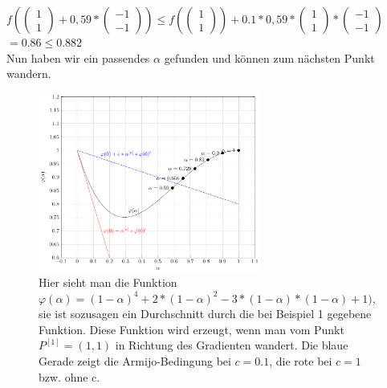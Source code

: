\documentclass[naustrian]{article}
\begin{document}
{\begin{enumerate}
    $f( \left( \begin{array}{c} 1 \\ 1 \end{array} \right) + 0,59 * \left( \begin{array}{c} -1 \\ -1 \end{array} \right)) \leq f(\left( \begin{array}{c} 1 \\ 1 \end{array} \right)) + 0.1 * 0,59 *  \left( \begin{array}{c} 1 \\ 1 \end{array} \right) * \left( \begin{array}{c} -1 \\ -1 \end{array} \right)$ \\
    $= 0.86 \leq 0.882$ \\
    Nun haben wir ein passendes $\alpha$ gefunden und können zum nächsten Punkt wandern.

    \begin{figure}[H]
        \centering
        \includegraphics[width=0.65\textwidth]{grad/figure3}
        \caption[Die Armijo-Bedingung] {Hier sieht man die Funktion $\varphi(\alpha)=(1-\alpha)^4+2*(1-\alpha)^2-3*(1-\alpha)*(1-\alpha)+1)$, sie ist sozusagen ein Durchschnitt durch die bei Beispiel 1 gegebene Funktion. Diese Funktion wird erzeugt, wenn man vom Punkt $P^{[1]}=(1,1)$ in Richtung des Gradienten wandert. Die blaue Gerade zeigt die Armijo-Bedingung bei $c=0.1$, die rote bei $c=1$ bzw. ohne c.}
    \end{figure}


\end{enumerate}}
\end{document}
